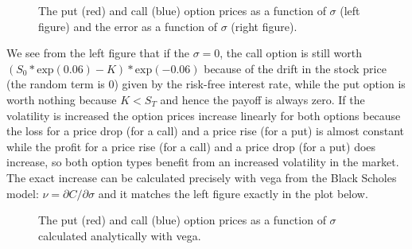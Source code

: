 \documentclass[11pt,a4paper]{article}
\begin{document}
\begin{figure}[H]
  \centering
  \caption{The put (red) and call (blue) option prices as a function of $\sigma$ (left figure) and the error as a function of $\sigma$ (right figure).}
  \label{fig:vol}
\end{figure}

We see from the left figure that if the $\sigma = 0$, the call option is still worth $(S_0*\text{exp}(0.06) - K) * \text{exp}(-0.06)$ because of the drift in the stock price (the random term is 0) given by the risk-free interest rate, while the put option is worth nothing because $K < S_T$ and hence the payoff is always zero. If the volatility is increased the option prices increase linearly for both options because the loss for a price drop (for a call) and a price rise (for a put) is almost constant while the profit for a price rise (for a call) and a price drop (for a put) does increase, so both option types benefit from an increased volatility in the market. The exact increase can be calculated precisely with vega from the Black Scholes model: $\nu=\partial C/ \partial \sigma$ and it matches the left figure exactly in the plot below.

\begin{figure}[H]
  \centering
  \caption{The put (red) and call (blue) option prices as a function of $\sigma$ calculated analytically with vega.}
  \label{fig:vega}
\end{figure}
\end{document}
